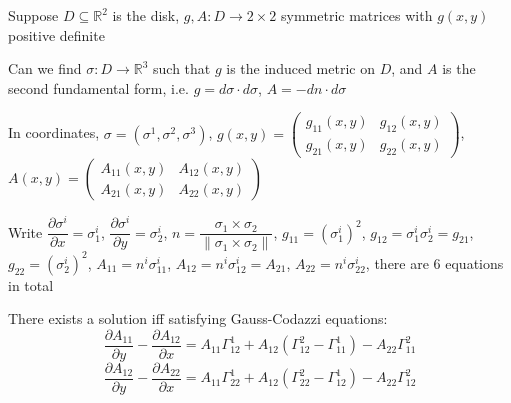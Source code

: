 \documentclass[../main.tex]{subfiles}
\begin{document}
\begin{example}
Suppose $D\subseteq\mathbb R^2$ is the disk, $g,A:D\to 2\times 2$ symmetric matrices with $g(x,y)$ positive definite \par
Can we find $\sigma:D\to\mathbb R^3$ such that $g$ is the induced metric on $D$, and $A$ is the second fundamental form, i.e. $g=d\sigma\cdot d\sigma$, $A=-dn\cdot d\sigma$ \par
In coordinates, $\sigma=(\sigma^1,\sigma^2,\sigma^3)$, $g(x,y)=\begin{pmatrix}
g_{11}(x,y) & g_{12}(x,y) \\
g_{21}(x,y) & g_{22}(x,y)
\end{pmatrix}$, $A(x,y)=\begin{pmatrix}
A_{11}(x,y) & A_{12}(x,y) \\
A_{21}(x,y) & A_{22}(x,y)
\end{pmatrix}$ \par
Write $\dfrac{\partial\sigma^i}{\partial x}=\sigma^i_1$, $\dfrac{\partial\sigma^i}{\partial y}=\sigma^i_2$, $n=\dfrac{\sigma_1\times\sigma_2}{\|\sigma_1\times\sigma_2\|}$, $g_{11}=(\sigma^i_1)^2$, $g_{12}=\sigma^i_1\sigma^i_2=g_{21}$, $g_{22}=(\sigma^i_2)^2$, $A_{11}=n^i\sigma^i_{11}$, $A_{12}=n^i\sigma^i_{12}=A_{21}$, $A_{22}=n^i\sigma^i_{22}$, there are $6$ equations in total \par
There exists a solution iff satisfying Gauss-Codazzi equations:
\[\dfrac{\partial A_{11}}{\partial y}-\dfrac{\partial A_{12}}{\partial x}=A_{11}\Gamma^1_{12}+A_{12}(\Gamma^2_{12}-\Gamma^1_{11})-A_{22}\Gamma^2_{11}\]
\[\dfrac{\partial A_{12}}{\partial y}-\dfrac{\partial A_{22}}{\partial x}=A_{11}\Gamma^1_{22}+A_{12}(\Gamma^2_{22}-\Gamma^1_{12})-A_{22}\Gamma^2_{12}\]
\end{example}
\end{document}

